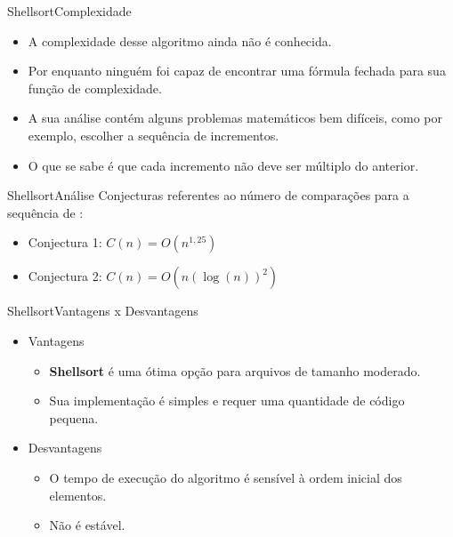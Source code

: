 \documentclass[aspectratio=169]{beamer}
\begin{document}
\begin{frame}{Shellsort}{Complexidade}
\begin{itemize}
\item A complexidade desse algoritmo ainda não é conhecida.
\item Por enquanto ninguém foi capaz de encontrar uma fórmula fechada para sua função de complexidade.
\item A sua análise contém alguns problemas matemáticos bem difíceis, como por exemplo, escolher a sequência de incrementos.
\item O que se sabe é que cada incremento não deve ser múltiplo do anterior.
\end{itemize}
\end{frame}


\begin{frame}{Shellsort}{Análise}
Conjecturas referentes ao número de 
comparações para a sequência de :
\begin{itemize}
\item Conjectura 1: $C(n) = O(n^{1,25})$
\item Conjectura 2: $C(n) = O(n( \log (n))^2)$
\end{itemize}
\end{frame}


\begin{frame}{Shellsort}{Vantagens x Desvantagens}
\begin{itemize}
\item Vantagens
\begin{itemize}
\item {\bf Shellsort} é uma ótima opção para arquivos de tamanho moderado.
\item Sua implementação é simples e requer uma quantidade de código pequena.
\end{itemize}
\item Desvantagens
\begin{itemize}
\item O tempo de execução do algoritmo é sensível à ordem inicial dos elementos.
\item Não é estável.
\end{itemize}
\end{itemize}
\end{frame}
\end{document}
